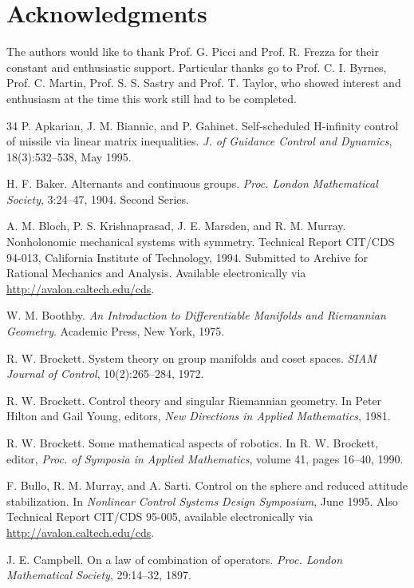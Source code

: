 \documentclass[11pt]{article}
\begin{document}
\section*{Acknowledgments}
The authors would like to thank Prof. G. Picci and Prof. R. Frezza for their constant and enthusiastic support. Particular thanks go to Prof. C. I. Byrnes, Prof. C. Martin, Prof. S. S. Sastry and Prof. T. Taylor, who showed interest and enthusiasm at the time this work still had to be completed.



\begin{thebibliography}{34}
 P. Apkarian, J. M. Biannic, and P. Gahinet. Self-scheduled H-infinity control of missile via linear matrix inequalities. \emph{J. of Guidance Control and Dynamics}, 18(3):532--538, May 1995.

 H. F. Baker. Alternants and continuous groups. \emph{Proc. London Mathematical Society}, 3:24--47, 1904. Second Series.

 A. M. Bloch, P. S. Krishnaprasad, J. E. Marsden, and R. M. Murray. Nonholonomic mechanical systems with symmetry. Technical Report CIT/CDS 94-013, California Institute of Technology, 1994. Submitted to Archive for Rational Mechanics and Analysis. Available electronically via \url{http://avalon.caltech.edu/cds}.

 W. M. Boothby. \emph{An Introduction to Differentiable Manifolds and Riemannian Geometry}. Academic Press, New York, 1975.

 R. W. Brockett. System theory on group manifolds and coset spaces. \emph{SIAM Journal of Control}, 10(2):265--284, 1972.

 R. W. Brockett. Control theory and singular Riemannian geometry. In Peter Hilton and Gail Young, editors, \emph{New Directions in Applied Mathematics}, 1981.

 R. W. Brockett. Some mathematical aspects of robotics. In R. W. Brockett, editor, \emph{Proc. of Symposia in Applied Mathematics}, volume 41, pages 16--40, 1990.

 F. Bullo, R. M. Murray, and A. Sarti. Control on the sphere and reduced attitude stabilization. In \emph{Nonlinear Control Systems Design Symposium}, June 1995. Also Technical Report CIT/CDS 95-005, available electronically via \url{http://avalon.caltech.edu/cds}.

 J. E. Campbell. On a law of combination of operators. \emph{Proc. London Mathematical Society}, 29:14--32, 1897.


\end{thebibliography}
\end{document}
